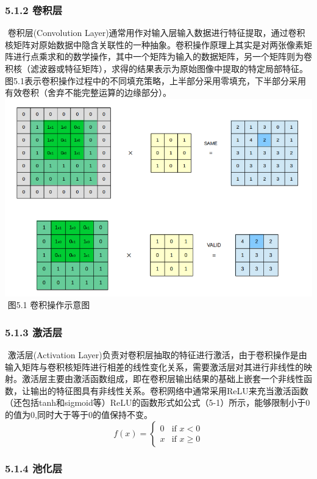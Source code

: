 \subsubsection{5.1.2 卷积层}\label{ux5377ux79efux5c42}

​ 卷积层(Convolution
Layer)通常用作对输入层输入数据进行特征提取，通过卷积核矩阵对原始数据中隐含关联性的一种抽象。卷积操作原理上其实是对两张像素矩阵进行点乘求和的数学操作，其中一个矩阵为输入的数据矩阵，另一个矩阵则为卷积核（滤波器或特征矩阵），求得的结果表示为原始图像中提取的特定局部特征。图5.1表示卷积操作过程中的不同填充策略，上半部分采用零填充，下半部分采用有效卷积（舍弃不能完整运算的边缘部分）。
​ \includegraphics{img/ch5/convolution.png} ​ 图5.1 卷积操作示意图

\subsubsection{5.1.3 激活层}\label{ux6fc0ux6d3bux5c42}

​ 激活层(Activation
Layer)负责对卷积层抽取的特征进行激活，由于卷积操作是由输入矩阵与卷积核矩阵进行相差的线性变化关系，需要激活层对其进行非线性的映射。激活层主要由激活函数组成，即在卷积层输出结果的基础上嵌套一个非线性函数，让输出的特征图具有非线性关系。卷积网络中通常采用ReLU来充当激活函数（还包括tanh和sigmoid等）ReLU的函数形式如公式（5-1）所示，能够限制小于0的值为0,同时大于等于0的值保持不变。
\[
f(x)=\begin{cases}
   0 &\text{if } x<0 \\
   x &\text{if } x\ge 0
\end{cases}
\tag{5-1}
\]

\subsubsection{5.1.4 池化层}\label{ux6c60ux5316ux5c42}

